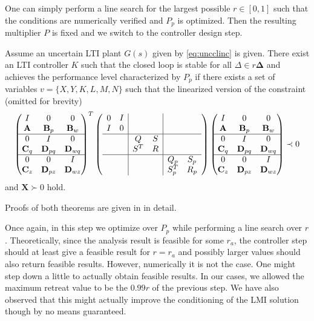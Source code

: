 One can simply perform a line search for the largest possible $r\in[0,1]$ such that the conditions are numerically
verified and $P_p$ is optimized. Then the resulting multiplier $P$ is fixed and we switch to the controller design step.

\begin{thm}\label{thm:synthesis} Assume an uncertain LTI plant $G(s)$ given by \eqref{eq:uncclinc}
is given. There exist an LTI controller $K$ such that the closed loop is stable for all $\Delta\in r\bm{\Delta}$ and achieves 
the performance level characterized by $P_p$ if there exists a set of variables $v=\{X,Y,K,L,M,N\}$ such that the linearized 
version of the constraint (omitted for brevity)
\begin{equation}
\begin{pmatrix}
I&0&0\\\mathbf{A}&\mathbf{B}_p&\mathbf{B}_w\\\hline
0&I&0\\\mathbf{C}_q&\mathbf{D}_{pq}&\mathbf{D}_{wq}\\\hline
0&0&I\\\mathbf{C}_z&\mathbf{D}_{pz}&\mathbf{D}_{wz}
\end{pmatrix}^T
\left(
\begin{array}{cc|cc|cc}
	0&I&&&&\\
	I&0&&&&\\\hline
	&&Q&S&&\\
	&&S^T&R&&\\\hline
	&&&&Q_p&S_p\\
	&&&&S_p^T&R_p\\
\end{array}
\right)
\begin{pmatrix}
I&0&0\\\mathbf{A}&\mathbf{B}_p&\mathbf{B}_w\\\hline
0&I&0\\\mathbf{C}_q&\mathbf{D}_{pq}&\mathbf{D}_{wq}\\\hline
0&0&I\\\mathbf{C}_z&\mathbf{D}_{pz}&\mathbf{D}_{wz}
\end{pmatrix}\prec 0
\label{eq:thmsynthLMI}
\end{equation}
and $\mathbf{X}\succ 0$ hold.
\end{thm}

Proofs of both theorems are given in \cite{lmibook99} in detail. 


Once again, in this step we optimize over $P_p$ while performing a line search over $r$. Theoretically, since the analysis result
is feasible for some $r_a$, the controller step should at least give a feasible result for $r=r_a$ and possibly larger values
should also return feasible results. However, numerically it is not the case. One might step down a little to actually obtain 
feasible results. In our cases, we allowed the maximum retreat value to be the $0.99r$ of the previous step. We have also 
observed that this might actually improve the conditioning of the LMI solution though by no means guaranteed. 

